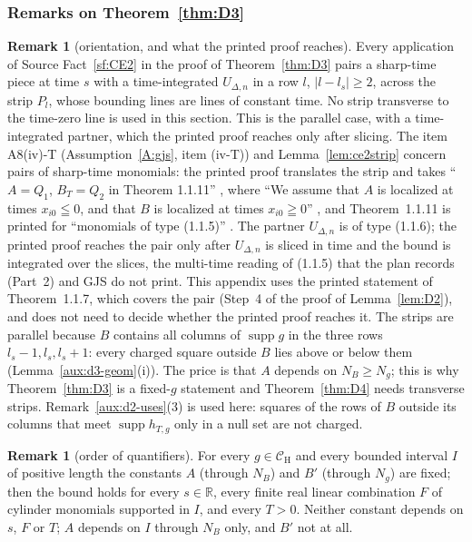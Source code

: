 \documentclass[11pt,a4paper]{article}
\theoremstyle{plain}
\theoremstyle{definition}
\theoremstyle{plain}
\theoremstyle{definition}
\newtheorem{auxrem}[auxlemma]{Remark}
\newcommand{\R}{\mathbb{R}}
\newcommand{\CH}{\mathcal{C}_{\mathrm H}}
\DeclareMathOperator{\supp}{supp}
\begin{document}
\subsubsection{Remarks on Theorem~\ref{thm:D3}}\label{sub:d3-rem}

\begin{auxrem}[orientation, and what the printed proof reaches]\label{aux:d3-orient}
Every application of Source Fact~\ref{sf:CE2} in the proof of Theorem~\ref{thm:D3} pairs a sharp-time
piece at time $s$ with a time-integrated $U_{\Delta,n}$ in a row $l$, $|l-l_s|\ge2$, across the
strip $P_l$, whose bounding lines are lines of constant time.  No strip transverse to the
time-zero line is used in this section.  This is the parallel case, with a time-integrated
partner, which the printed proof reaches only after slicing.  The item A8(iv)-T
(Assumption~\ref{A:gjs}, item (iv-T)) and Lemma~\ref{lem:ce2strip} concern pairs of sharp-time
monomials: the printed proof translates the strip and takes ``$A=Q_1$, $B_T=Q_2$ in Theorem
1.1.11'' \cite[p.~597]{GJS}, where ``We assume that $A$ is localized at times $x_{i0}\leqq0$, and
that $B$ is localized at times $x_{i0}\geqq0$'' \cite[p.~596]{GJS}, and Theorem~1.1.11 is printed
for ``monomials of type (1.1.5)'' \cite[p.~596]{GJS}.  The partner $U_{\Delta,n}$ is of type
(1.1.6); the printed proof reaches the pair only after $U_{\Delta,n}$ is sliced in time and the
bound is integrated over the slices, the multi-time reading of (1.1.5) that the plan records
(Part~2) and GJS do not print.  This appendix uses the printed statement of Theorem~1.1.7, which covers
the pair (Step~4 of the proof of Lemma~\ref{lem:D2}), and does not need to decide whether the
printed proof reaches it.  The strips are parallel because $B$ contains all columns of $\supp g$
in the three rows $l_s-1,l_s,l_s+1$: every charged square outside $B$ lies above or below them
(Lemma~\ref{aux:d3-geom}(i)).  The price is that $A$ depends on $N_B\ge N_g$; this is why
Theorem~\ref{thm:D3} is a fixed-$g$ statement and Theorem~\ref{thm:D4} needs transverse strips.
Remark~\ref{aux:d2-uses}(3) is used here: squares of the rows of $B$ outside its columns that meet
$\supp h_{T,g}$ only in a null set are not charged.
\end{auxrem}

\begin{auxrem}[order of quantifiers]\label{aux:d3-quant}
For every $g\in\CH$ and every bounded interval $I$ of positive length the constants $A$ (through
$N_B$) and $B'$ (through $N_g$) are fixed; then the bound holds for every $s\in\R$, every finite
real linear combination $F$ of cylinder monomials supported in $I$, and every $T>0$.  Neither
constant depends on $s$, $F$ or $T$; $A$ depends on $I$ through $N_B$ only, and $B'$ not at all.
\end{auxrem}
\end{document}
